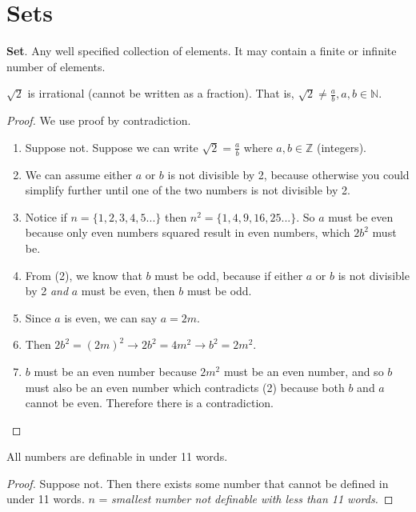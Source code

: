 \section{Sets}

\begin{definition}
\textbf{Set}. Any well specified collection of elements. It may contain a finite or infinite number of elements.
\end{definition}

\begin{example}
$\sqrt{2}$ is irrational (cannot be written as a fraction). That is, $\sqrt{2} \neq \frac{a}{b}, a,b \in \mathbb{N}$.
\end{example}

\begin{proof}
We use proof by contradiction.
\begin{enumerate}
\item Suppose not. Suppose we can write $\sqrt{2}=\frac{a}{b}$ where $a,b \in \mathbb{Z}$ (integers).
\item We can assume either $a$ or $b$ is not divisible by 2, because otherwise you could simplify further until one of the two numbers is not divisible by 2.
\item Notice if $n = \lbrace 1,2,3,4,5... \rbrace$ then $n^2 = \lbrace 1,4,9,16,25... \rbrace$. So $a$ must be even because only even numbers squared result in even numbers, which $2b^2$ must be.
\item From (2), we know that $b$ must be odd, because if either $a$ or $b$ is not divisible by 2 \textit{and} $a$ must be even, then $b$ must be odd.
\item Since $a$ is even, we can say $a=2m$.
\item Then $2b^2=(2m)^2 \rightarrow 2b^2=4m^2 \rightarrow b^2=2m^2$.
\item $b$ must be an even number because $2m^2$ must be an even number, and so $b$ must also be an even number which contradicts (2) because both $b$ and $a$ cannot be even. Therefore there is a contradiction.
\end{enumerate}
\end{proof}

\begin{example}
All numbers are definable in under 11 words.
\end{example}

\begin{proof}
Suppose not. Then there exists some number that cannot be defined in under 11 words. $n$ = \textit{smallest number not definable with less than 11 words.}
\end{proof}
